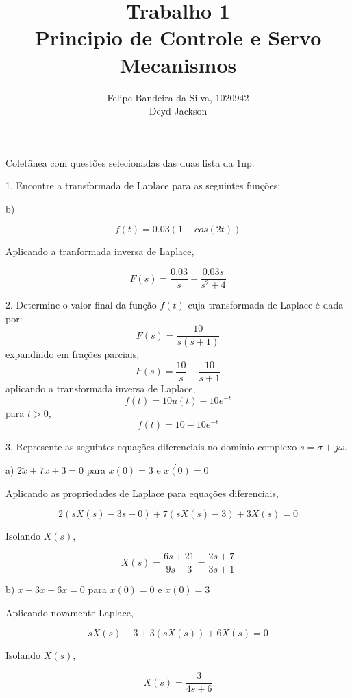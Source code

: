 \documentclass[paper=a4, fontsize=11pt]{article}
\title{Trabalho 1\\Principio de Controle e Servo Mecanismos}
\author{Felipe Bandeira da Silva, 1020942\\Deyd Jackson}
\begin{document}
\maketitle

Coletânea com questões selecionadas das duas lista da 1np.



\newpage

1. Encontre a transformada de Laplace para as seguintes funções:

b) 

$$
f(t) = 0.03(1 - cos(2t))
$$

Aplicando a tranformada inversa de Laplace,

$$
F(s) = \frac{0.03}{s} - \frac{0.03 s}{s^2+4}
$$

\newpage

2. Determine o valor final da função $f(t)$ cuja transformada de Laplace é dada por:
$$
F(s) = \frac{10}{s(s+1)}
$$
expandindo em frações parciais,
$$
F(s) = \frac{10}{s} - \frac{10}{s+1}
$$
aplicando a transformada inversa de Laplace,
$$
f(t) = 10 u(t) - 10 e^{-t}
$$
para $t>0$,
$$
f(t) = 10 - 10 e^{-t}
$$

\newpage

3. Represente as seguintes equações diferenciais no domínio complexo $s=\sigma + j \omega$.

a) $2 \ddot{x} + 7 \dot{x} +  3 = 0$ para $x(0)=3$ e $\dot{x(0)}=0$

Aplicando as propriedades de Laplace para equações diferenciais,

$$
2 (s X(s) - 3 s - 0) + 7 (s X(s) - 3) + 3 X(s) = 0
$$

Isolando $X(s)$,

$$
X(s) = \frac{6s + 21}{9 s + 3} = \frac{2 s + 7}{3 s + 1}
$$

b) $\ddot{x} + 3 \ddot{x} + 6 x = 0$ para $x(0) = 0$ e $\dot{x(0)}=3$

Aplicando novamente Laplace,

$$
s X(s) - 3 + 3 (s X(s)) + 6 X(s) = 0
$$

Isolando $X(s)$,

$$
X(s) = \frac{3}{4 s + 6}
$$
\end{document}
